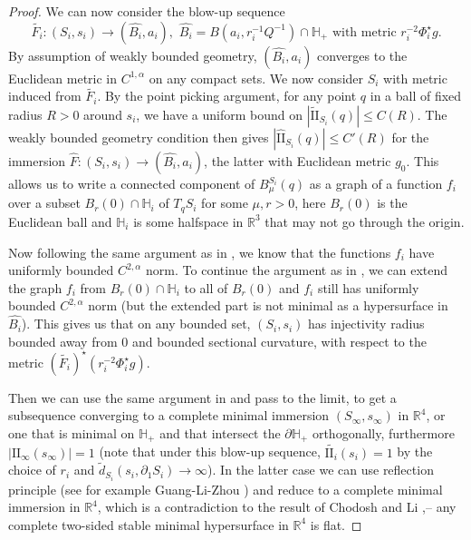 \documentclass[12pt]{amsart}
\newcommand{\HH}{\mathbb{H}}
\newcommand{\R}{\mathbb R}
\newcommand{\sff}{\mathrm{I\!I}}
\newcommand{\p}{\partial}
\numberwithin{equation}{section}
\begin{document}
\begin{proof}
        We can now consider the blow-up sequence
        \begin{equation}
            \tilde{F_i}:(S_i,s_i) \rightarrow (\hat{B_i}, a_i), \,\, \hat{B_i}=B(a_i,r_i^{-1}Q^{-1})\cap \HH_+ \text{ with metric } 
			r_i^{-2}\Phi^{\star}_i g.
        \end{equation}
		By assumption of weakly bounded geometry, $(\hat{B_i}, a_i)$ converges to the Euclidean metric in $C^{1,\alpha}$ on any compact sets. We now consider $S_i$ with metric induced from $\tilde{F_i}$. By the point picking argument, for any point $q$ in a ball of fixed radius $R>0$ around $s_i$, we have a uniform bound on $|\tilde{\sff}_{S_i}(q)|\leq C(R)$. The weakly bounded geometry condition then gives $|\hat{\sff}_{S_i}(q)|\leq C'(R)$ for the immersion $\hat{F}:(S_i,s_i)\rightarrow (\hat{B_i},a_i)$, the latter with Euclidean metric $g_0$. This allows us to write a connected component of $B^{S_i}_{\mu}(q)$ as a graph of a function $f_i$ over a subset $B_r(0) \cap \HH_i$ of $T_q S_i$ for some $\mu,r >0$, here $B_r(0)$ is the Euclidean ball and $\HH_i$ is some halfspace in $\R^3$ that may not go through the origin. 
		
		Now following the same argument as in \cite{ChodoLiStryk2022-CompleteStableMinimal}, we know that the functions $f_i$ have uniformly bounded $C^{2,\alpha}$ norm. To continue the argument as in \cite{ChodoLiStryk2022-CompleteStableMinimal}, we can extend the graph $f_i$ from $B_r(0)\cap \HH_i$ to all of $B_r(0)$ and $f_i$ still has uniformly bounded $C^{2,\alpha}$ norm (but the extended part is not minimal as a hypersurface in $\hat{B_i}$). This gives us that on any bounded set, $(S_i,s_i)$ has injectivity radius bounded away from $0$ and bounded sectional curvature, with respect to the metric $(\tilde{F_i})^{\star} (r_i^{-2}\Phi_i^{\star}g)$.
		
		Then we can use the same argument in \cite{ChodoLiStryk2022-CompleteStableMinimal} and pass to the limit, to get  a subsequence converging to a complete minimal immersion $(S_{\infty},s_{\infty})$ in $\R^4$, or one that is minimal on $\HH_+$ and that intersect the $\p \HH_+$ orthogonally, furthermore $|\sff_{\infty}(s_{\infty})|=1$ (note that under this blow-up sequence, $\tilde{\sff_i}(s_i)=1$ by the choice of $r_i$ and $\tilde{d}_{S_i}(s_i,\p_1 S_i) \rightarrow \infty$). In the latter case we can use reflection principle (see for example Guang-Li-Zhou \cite{GuangLiZhou2020-CurvatureEstimatesStable}) and reduce to a complete minimal immersion in $\R^4$, which is a contradiction to the result of Chodosh and Li \cite{ChodoLi2021-StableMinimalHypersurfaces},\cite{ChodoLi2022-StableAnisotropicMinimal}-- any complete two-sided stable minimal hypersurface in $\R^4$ is flat.
    \end{proof}
\end{document}
